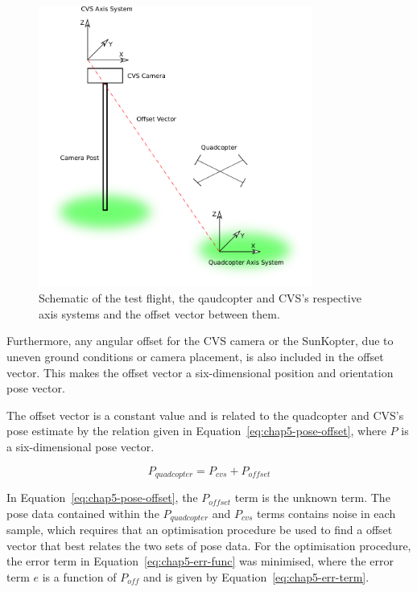 \begin{figure}
  \centering
  \includegraphics[width=0.8\textwidth]{figures/chapter5/test_flight_schem}
  \caption[Shematic of the test flight layout.]{Schematic of the test flight, the qaudcopter and CVS's respective axis systems and the offset vector between them.}
\label{fig:chap5-flight-test-schem}
\end{figure}

Furthermore, any angular offset for the CVS camera or the SunKopter, due to uneven ground conditions or camera placement, is also included in the offset vector. This makes the offset vector a six-dimensional position and orientation pose vector. 

The offset vector is a constant value and is related to the quadcopter and CVS's pose estimate by the relation given in Equation~\ref{eq:chap5-pose-offset}, where $P$ is a six-dimensional pose vector. 

\begin{equation}
  \label{eq:chap5-pose-offset}
  P_{quadcopter} = P_{cvs} + P_{offset}
\end{equation}

In Equation~\ref{eq:chap5-pose-offset}, the $P_{offset}$ term is the unknown term. The pose data contained within the $P_{quadcopter}$ and $P_{cvs}$ terms contains noise in each sample, which requires that an optimisation procedure be used to find a offset vector that best relates the two sets of pose data. For the optimisation procedure, the error term in Equation~\ref{eq:chap5-err-func} was minimised, where the error term $e$ is a function of $P_{off}$ and is given by Equation~\ref{eq:chap5-err-term}. 

